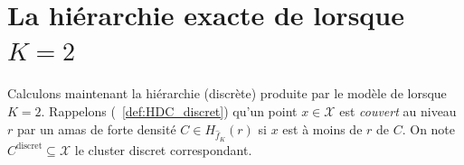 \section{La hiérarchie exacte de  lorsque $K=2$}

Calculons maintenant la hiérarchie (discrète) produite par le modèle de  lorsque $K=2$.
Rappelons (\Def~\ref{def:HDC_discret}) qu'un point $x\in\mathcal X$ est \emph{couvert} au niveau $r$ par un amas de forte densité $ C \in H_{\widehat f_K}(r)$ si $x $ est à moins de $r$ de $C$. On note $C^{\mathrm{discret}} \subseteq \mathcal X$ le cluster discret correspondant.





\begin{figure}[htbp]
    \centering
    
    \begin{subfigure}[b]{0.45\textwidth}
        \centering
\end{subfigure}
\end{figure}
